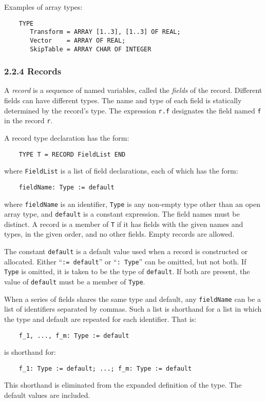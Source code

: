 \documentclass[10pt]{article}
\begin{document}
Examples of array types:
\begin{verbatim}
    TYPE
       Transform = ARRAY [1..3], [1..3] OF REAL;
       Vector    = ARRAY OF REAL;
       SkipTable = ARRAY CHAR OF INTEGER
\end{verbatim}

\subsubsection*{2.2.4 Records}

A \emph{record} is a sequence of named variables, called the \emph{fields} of
the record.  Different fields can have different types.  The name and type of
each field is statically determined by the record's type.  The expression
\verb|r.f| designates the field named \verb|f| in the record \verb|r|.

A record type declaration has the form:
\begin{verbatim}
    TYPE T = RECORD FieldList END
\end{verbatim}
where \verb|FieldList| is a list of field declarations, each of which has the
form:
\begin{verbatim}
    fieldName: Type := default
\end{verbatim}
where \verb|fieldName| is an identifier, \verb|Type| is any non-empty type
other than an open array type, and \verb|default| is a constant expression.
The field names must be distinct.  A record is a member of \verb|T| if it has
fields with the given names and types, in the given order, and no other
fields.  Empty records are allowed.

The constant \verb|default| is a default value used when a record is
constructed or allocated.  Either ``\verb|:= default|'' or ``\verb|: Type|''
can be omitted, but not both.  If \verb|Type| is omitted, it is taken to be
the type of \verb|default|.  If both are present, the value of \verb|default|
must be a member of \verb|Type|.

When a series of fields shares the same type and default, any \verb|fieldName|
can be a list of identifiers separated by commas.  Such a list is shorthand
for a list in which the type and default are repeated for each identifier.
That is:
\begin{verbatim}
    f_1, ..., f_m: Type := default
\end{verbatim}
is shorthand for:
\begin{verbatim}
    f_1: Type := default; ...; f_m: Type := default
\end{verbatim}
This shorthand is eliminated from the expanded definition of the type.  The
default values are included.
\end{document}
